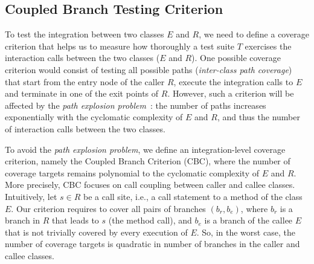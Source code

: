 \subsection{Coupled Branch Testing Criterion}

\label{sec:approach:coupledBranchDef}



To test the integration between two classes $E$ and $R$, we need to define a coverage criterion that helps us to measure how thoroughly a test suite $T$ exercises the interaction calls between the two classes ($E$ and $R$). One possible coverage criterion would consist of testing all possible paths (\textit{inter-class path coverage}) that start from the entry node of the caller $R$, execute the integration calls to $E$ and terminate in one of the exit points of $R$. However, such a criterion will be affected by the \textit{path explosion problem}~\cite{cadar2013symbolic}: the number of paths increases exponentially with the cyclomatic complexity of $E$ and $R$, and thus the number of interaction calls between the two classes.

To avoid the \textit{path explosion problem}, we define an integration-level coverage criterion, namely the Coupled Branch Criterion (CBC), where the number of coverage targets remains polynomial to the cyclomatic complexity of $E$ and $R$. More precisely, CBC focuses on call coupling between caller and callee classes. Intuitively, let $s \in R$ be a call site, i.e., a call statement to a method of the class $E$. Our criterion requires to cover all pairs of branches $ (b_r, b_e)$, where $b_r$ is a branch in $R$ that leads to $s$ (the method call), and $b_e$ is a branch of the callee $E$ that is not trivially covered by every execution of $E$. So, in the worst case, the number of coverage targets is quadratic in number of branches in the caller and callee classes.


